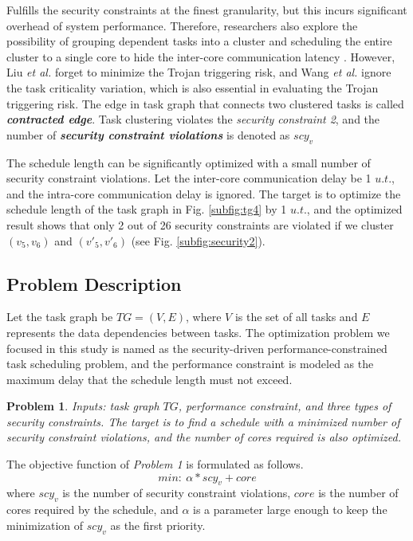 \documentclass[conference]{IEEEtran}
\newtheorem{problem}{\textbf{Problem}}
\begin{document}
Fulfills the security constraints at the finest granularity, but this incurs significant overhead of system performance. Therefore, researchers also explore the possibility of grouping dependent tasks into a cluster and scheduling the entire cluster to a single core to hide the inter-core communication latency \cite{article:CL} \cite{article:NW}. However, Liu \textit{et al.} \cite{article:CL} forget to minimize the Trojan triggering risk, and Wang \textit{et al.} \cite{article:NW} ignore the task criticality variation, which is also essential in evaluating the Trojan triggering risk. The edge in task graph that connects two clustered tasks is called \textit{\textbf{contracted edge}}. Task clustering violates the \textit{security constraint 2}, and the number of \textbf{\textit{security constraint violations}} is denoted as $scy_v$

The schedule length can be significantly optimized with a small number of security constraint violations. Let the inter-core communication delay be 1 $u.t.$, and the intra-core communication delay is ignored. The target is to optimize the schedule length of the task graph in Fig. \ref{subfig:tg4} by 1 $u.t.$, and the optimized result shows that only 2 out of 26 security constraints are violated if we cluster $(v_5,v_6)$ and $(v'_5,v'_6)$ (see Fig. \ref{subfig:security2}).









\subsection{Problem Description}


Let the task graph be $TG=(V,E)$, where $V$ is the set of all tasks and $E$ represents the data dependencies between tasks. The optimization problem we focused in this study is named as the security-driven performance-constrained task scheduling problem, and the performance constraint is modeled as the maximum delay that the schedule length must not exceed.

\begin{problem}
Inputs: task graph $TG$, performance constraint, and three types of security constraints. The target is to find a schedule with a minimized number of security constraint violations, and the number of cores required is also optimized.
\end{problem}

The objective function of \textit{Problem 1} is formulated as follows.
\begin{equation}
min:~\alpha*scy_v+core
\end{equation}
\noindent where $scy_v$ is the number of security constraint violations, $core$ is the number of cores required by the schedule, and $\alpha$ is a parameter large enough to keep the minimization of $scy_v$ as the first priority.
\end{document}
